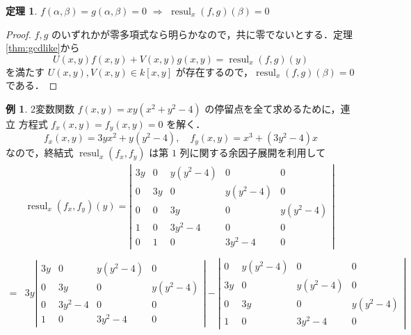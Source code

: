 \documentclass[12pt, uplatex, dvipdfmx]{jsarticle}
\theoremstyle{definition}
\newtheorem{theorem}{定理}
\newtheorem{example}{例}
\DeclareMathOperator{\resul}{resul}
\begin{document}
\begin{theorem}\label{thm:elimination}
  $f(\alpha,\beta)=g(\alpha,\beta)=0$ $\Longrightarrow$ $\resul_x(f,g)(\beta)=0$
\end{theorem}

\begin{proof}
  $f,g$ のいずれかが零多項式なら明らかなので，共に零でないとする．定理\ref{thm:gcdlike}から
  \[
    U(x,y) f(x,y) + V(x,y) g(x,y) = \resul_x(f,g)(y)
  \]
  を満たす $U(x,y), V(x,y) \in k[x,y]$ が存在するので，$\resul_x(f,g)(\beta)=0$ である．
\end{proof}

\newpage

\begin{example}
  2変数関数 $f(x,y) = x y (x^2+y^2-4)$ の停留点を全て求めるために，連立
  方程式 $f_x(x,y)=f_y(x,y)=0$ を解く．
  \[
    f_x(x,y)= 3y x^2 + y(y^2-4), \quad f_y(x,y)=x^3+(3y^2-4)x
  \]
  なので，終結式 $\resul_x(f_x, f_y)$ は第 $1$ 列に関する余因子展開を利用して
  \renewcommand{\arraystretch}{1.2}
  \[
    \begin{aligned}
      &\resul_x(f_x, f_y)(y) = \left|
        \begin{array}{ccccc}
          3y & 0 & y(y^2-4) & 0 & 0\\
          0 & 3y & 0 & y(y^2-4) & 0\\
          0 & 0 & 3y & 0 & y(y^2-4)\\
          1 & 0 & 3y^2-4 & 0 & 0\\
          0 & 1 & 0 & 3y^2-4 & 0
        \end{array}
      \right|\\ \\
      = & 3y \left|
        \begin{array}{cccc}
          3y & 0 & y(y^2-4) & 0\\
          0 & 3y & 0 & y(y^2-4)\\
          0 & 3y^2-4 & 0 & 0\\
          1 & 0 & 3y^2-4 & 0
        \end{array}
      \right| - \left|
        \begin{array}{cccc}
          0 & y(y^2-4) & 0 & 0\\
          3y & 0 & y(y^2-4) & 0\\
          0 & 3y & 0 & y(y^2-4)\\
          1 & 0 & 3y^2-4 & 0
        \end{array}
      \right| \\ \\

\end{aligned}\]
\end{example}
\end{document}
